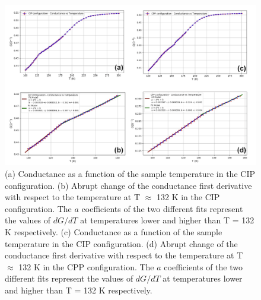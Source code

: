 \documentclass[journal]{IEEEtran}
\begin{document}
\begin{figure}[h!]
    \centering
    \includegraphics[scale=0.55]{Lab2-GvsT.png}
    \caption{(a) Conductance as a function of the sample temperature in the CIP configuration. (b) Abrupt change of the conductance first derivative with respect to the temperature at T $\approx$ 132 K in the CIP configuration. The $a$ coefficients of the two different fits represent the values of $dG/dT$ at temperatures lower and higher than T = 132 K respectively. (c) Conductance as a function of the sample temperature in the CIP configuration. (d) Abrupt change of the conductance first derivative with respect to the temperature at T $\approx$ 132 K in the CPP configuration. The $a$ coefficients of the two different fits represent the values of $dG/dT$ at temperatures lower and higher than T = 132 K respectively.}
    \label{fig:GvsT}
\end{figure}
\end{document}
